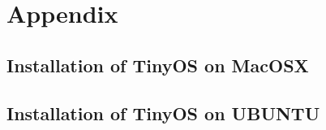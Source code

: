 
\chapter{Appendix}\label{ch:appendix}

\section{Installation of TinyOS on MacOSX}

\section{Installation of TinyOS on UBUNTU}
